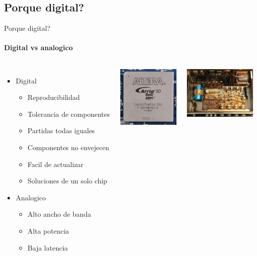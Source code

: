 \begin{darkframes}
    \subsection{Porque digital?}
    \begin{frame}{Porque digital?}
      \framesubtitle{Digital vs analogico}
      \begin{columns}[onlytextwidth]
            \begin{itemize}
               \item{Digital}
                  \begin{itemize}
                     \item{Reproducibilidad}
                     \item{Tolerancia de componentes}
                     \item{Partidas todas iguales}
                     \item{Componentes no envejecen}
                     \item{Facil de actualizar}
                     \item{Soluciones de un solo chip}
                  \end{itemize}
               \item{Analogico}
                  \begin{itemize}
                     \item{Alto ancho de banda}
                     \item{Alta potencia}
                     \item{Baja latencia}
                  \end{itemize}
            \end{itemize}
               \includegraphics[width=30mm]{1_clase/fpga}
               \newline

               \includegraphics[width=35mm]{1_clase/transistor_amp}
      \end{columns}
    \end{frame}



\end{darkframes}
